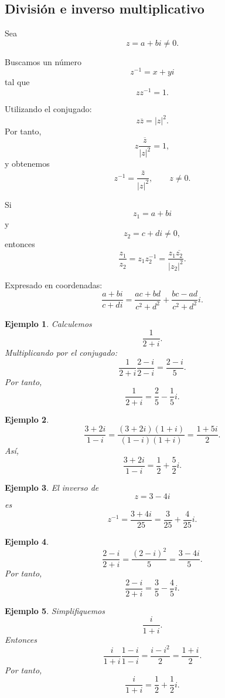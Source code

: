 \documentclass[12pt]{article}
\newtheorem{Ejem}{Ejemplo}
\begin{document}
\subsection*{División e inverso multiplicativo}

Sea
\[
z=a+bi\neq0.
\]

Buscamos un número
\[
z^{-1}=x+yi
\]
tal que
\[
zz^{-1}=1.
\]

Utilizando el conjugado:
\[
z\overline z=|z|^2.
\]
Por tanto,
\[
z\frac{\overline z}{|z|^2}=1,
\]
y obtenemos
\[
\boxed{
z^{-1}
=
\frac{\overline z}{|z|^2},
\qquad z\neq0.
}
\]

Si
\[
z_1=a+bi
\]
y
\[
z_2=c+di\neq0,
\]
entonces
\[
\frac{z_1}{z_2}
=
z_1z_2^{-1}
=
\frac{z_1\overline{z_2}}{|z_2|^2}.
\]

Expresado en coordenadas:
\[
\boxed{
\frac{a+bi}{c+di}
=
\frac{ac+bd}{c^2+d^2}
+
\frac{bc-ad}{c^2+d^2}i.
}
\]



\begin{Ejem} Calculemos
\[
\frac{1}{2+i}.
\]
Multiplicando por el conjugado:
\[
\frac{1}{2+i}
\frac{2-i}{2-i}
=
\frac{2-i}{5}.
\]
Por tanto,
\[
\boxed{
\frac{1}{2+i}
=
\frac25-\frac15 i.
}
\]
\end{Ejem}

\begin{Ejem} 
\[
\frac{3+2i}{1-i}
=
\frac{(3+2i)(1+i)}{(1-i)(1+i)}
=
\frac{1+5i}{2}.
\]
Así,
\[
\boxed{
\frac{3+2i}{1-i}
=
\frac12+\frac52 i.
}
\]
\end{Ejem}

\begin{Ejem} El inverso de
\[
z=3-4i
\]
es
\[
z^{-1}
=
\frac{3+4i}{25}
=
\boxed{
\frac3{25}+\frac4{25}i
}.
\]

\end{Ejem}

\begin{Ejem} 
\[
\frac{2-i}{2+i}
=
\frac{(2-i)^2}{5}
=
\frac{3-4i}{5}.
\]
Por tanto,
\[
\boxed{
\frac{2-i}{2+i}
=
\frac35-\frac45 i.
}
\]

\end{Ejem}

\begin{Ejem} 
Simplifiquemos
\[
\frac{i}{1+i}.
\]
Entonces
\[
\frac{i}{1+i}
\frac{1-i}{1-i}
=
\frac{i-i^2}{2}
=
\frac{1+i}{2}.
\]
Por tanto,
\[
\boxed{
\frac{i}{1+i}
=
\frac12+\frac12 i.
}
\]
\end{Ejem}
\end{document}
